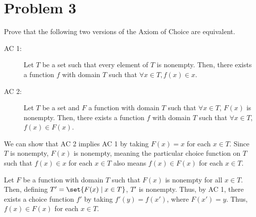 \documentclass[12pt]{mypackage}
\begin{document}
\section{Problem 3}%
\begin{problem}
  Prove that the following two versions of the Axiom of Choice are equivalent.
  \begin{description}
    \item[AC 1:] Let $T$ be a set such that every element of $T$ is nonempty. Then, there exists a function $f$ with domain $T$ such that $\forall x\in T, f(x)\in x$.
    \item[AC 2:] Let $T$ be a set and $F$ a function with domain $T$ such that $\forall x\in T$, $F(x)$ is nonempty. Then, there exists a function $f$ with domain $T$ such that $\forall x\in T$, $f(x)\in F(x)$.
  \end{description}
\end{problem}
\begin{solution}
  We can show that AC 2 implies AC 1 by taking $F(x) = x$ for each $x\in T$. Since $T$ is nonempty, $F(x)$ is nonempty, meaning the particular choice function on $T$ such that $f(x)\in x$ for each $x\in T$ also means $f(x)\in F(x)$ for each $x\in T$.\newline

  Let $F$ be a function with domain $T$ such that $F(x)$ is nonempty for all $x\in T$. Then, defining $T' = \set{F(x)\mid x\in T}$, $T'$ is nonempty. Thus, by AC 1, there exists a choice function $f'$ by taking $f'(y) = f(x')$, where $F(x') = y$. Thus, $f(x) \in F(x)$ for each $x\in T$.
\end{solution}
\end{document}
